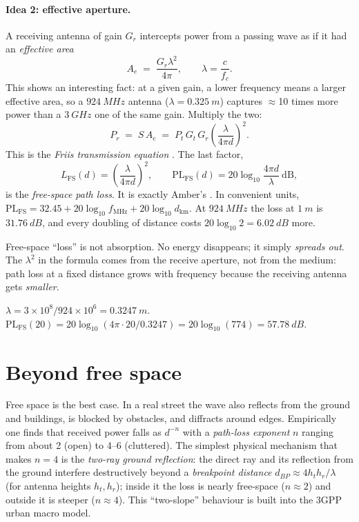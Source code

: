 \paragraph{Idea 2: effective aperture.}
A receiving antenna of gain $G_r$ intercepts power from a passing wave as if it
had an \emph{effective area}
\[
 A_e \;=\; \frac{G_r\lambda^2}{4\pi},\qquad \lambda=\frac{c}{f_c}.
\]
This shows an interesting fact: at a given gain, a lower frequency means a larger
effective area, so a $\SI{924}{MHz}$ antenna ($\lambda=\SI{0.325}{m}$) captures
$\approx$10 times more power than a $\SI{3}{GHz}$ one of the same gain. Multiply the two:
\begin{equation}
 P_r \;=\; S\,A_e \;=\; P_t\,G_t\,G_r\left(\frac{\lambda}{4\pi d}\right)^{\!2}.
\label{eq:friis}
\end{equation}
This is the \emph{Friis transmission equation} \citep{friis1946}. The last factor,
\begin{equation}
 L_{\mathrm{FS}}(d)=\left(\frac{\lambda}{4\pi d}\right)^{2},\qquad
 \mathrm{PL}_{\mathrm{FS}}(d)=20\log_{10}\frac{4\pi d}{\lambda}\ \mathrm{dB},
\label{eq:fspl}
\end{equation}
is the \emph{free-space path loss}. It is exactly Amber's . In
convenient units, $\mathrm{PL}_{\mathrm{FS}}=32.45+20\log_{10}f_{\mathrm{MHz}}+20\log_{10}d_{\mathrm{km}}$.
At $\SI{924}{MHz}$ the loss at $\SI{1}{m}$ is $\SI{31.76}{dB}$, and every doubling of
distance costs $20\log_{10}2=\SI{6.02}{dB}$ more.

\begin{keyidea}
Free-space ``loss'' is not absorption. No energy disappears; it simply
\emph{spreads out}. The $\lambda^2$ in the formula comes from the receive
aperture, not from the medium: path loss at a fixed distance grows with
frequency because the receiving antenna gets \emph{smaller}.
\end{keyidea}

\begin{example}
$\lambda=3\times10^{8}/924\times10^{6}=\SI{0.3247}{m}$.
$\mathrm{PL}_{\mathrm{FS}}(20)=20\log_{10}(4\pi\cdot20/0.3247)=20\log_{10}(774)=\SI{57.78}{dB}$.
\end{example}

\section{Beyond free space}
\label{sec:beyondfs}

Free space is the best case. In a real street the wave also reflects from the ground and
buildings, is blocked by obstacles, and diffracts around edges. Empirically one
finds that received power falls as $d^{-n}$ with a \emph{path-loss exponent} $n$
ranging from about 2 (open) to 4--6 (cluttered). The simplest physical
mechanism that makes $n=4$ is the \emph{two-ray ground reflection}: the direct
ray and its reflection from the ground interfere destructively beyond a
\emph{breakpoint distance} $d_{BP}\approx4h_th_r/\lambda$ (for antenna heights $h_t,h_r$); inside it the
loss is nearly free-space ($n\approx2$) and outside it is steeper ($n\approx4$).
This ``two-slope'' behaviour is built into the 3GPP urban macro model.

